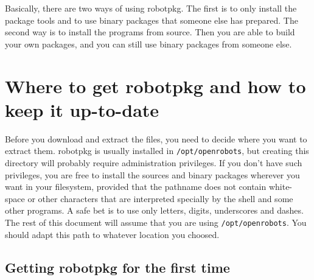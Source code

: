 %
%
%
%
%

Basically, there are two ways of using robotpkg.  The  first is to only install
the package tools  and to use binary packages  that someone  else has prepared.
The second way is  to install the programs from   source. Then you are able  to
build your  own packages, and  you can still use   binary packages from someone
else.


\section{Where to get robotpkg and how to keep it up-to-date} %
\label{section:getting}

Before you download and extract the files, you need to decide where you want to
extract  them.  robotpkg is  usually installed  in  {\tt /opt/openrobots},  but
creating this directory will probably   require administration privileges.   If
you don't have such privileges, you are free to  install the sources and binary
packages wherever you want in your filesystem, provided  that the pathname does
not contain white-space or other  characters that are interpreted specially  by
the shell and some other programs.  A safe bet is to  use only letters, digits,
underscores  and dashes. The rest of  this  document will  assume  that you are
using {\tt  /opt/openrobots}.  You should adapt  this path to whatever location
you choosed.


\subsection{Getting robotpkg for the first time} %

